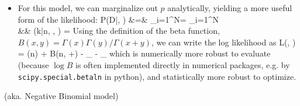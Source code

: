 \begin{itemize}
	\item For this model, we can marginalize out $p$ analytically, yielding a more useful form of the likelihood:
	\ba
		P(D\;|\;\alpha, \beta) &=& \prod_{i=1}^N = \prod_{i=1}^N
		\\
		&&
		(k\;|\;n, \alpha, \beta) =   
	\ea
	Using the definition of the beta function, $B(x,y) = \Gamma(x)\Gamma(y) / \Gamma(x + y)$, we can write the log likelihood as 
	\be
		L(\alpha, \beta) = \log(n) +  \log B(n, \alpha+\beta) - _ - _
	\ee
	which is numerically more robust to evaluate (because $\log B$ is often implemented directly in numerical packages, e.g. by \texttt{scipy.special.betaln} in python), and statistically more robust to optimize.
\end{itemize}

\newpage
{} (aka. Negative Binomial model)

